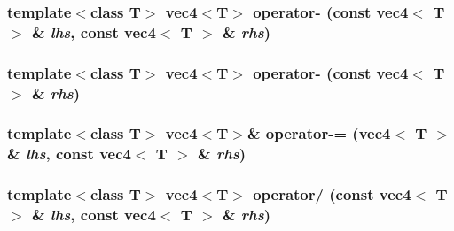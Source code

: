 \hypertarget{classnv_1_1vec4_212f0e52efde08a0093d329fcdaad1a3}{
\subsubsection[{operator-}]{\setlength{\rightskip}{0pt plus 5cm}template$<$class T$>$ {\bf vec4}$<$T$>$ operator- (const {\bf vec4}$<$ T $>$ \& {\em lhs}, \/  const {\bf vec4}$<$ T $>$ \& {\em rhs})}}
\label{classnv_1_1vec4_212f0e52efde08a0093d329fcdaad1a3}


\hypertarget{classnv_1_1vec4_8cc817f95174f06a8388b7fc2b8c2d3f}{
\subsubsection[{operator-}]{\setlength{\rightskip}{0pt plus 5cm}template$<$class T$>$ {\bf vec4}$<$T$>$ operator- (const {\bf vec4}$<$ T $>$ \& {\em rhs})}}
\label{classnv_1_1vec4_8cc817f95174f06a8388b7fc2b8c2d3f}


\hypertarget{classnv_1_1vec4_54e1e773b4df6a71b19eb4b5781a7ead}{
\subsubsection[{operator-=}]{\setlength{\rightskip}{0pt plus 5cm}template$<$class T$>$ {\bf vec4}$<$T$>$\& operator-= ({\bf vec4}$<$ T $>$ \& {\em lhs}, \/  const {\bf vec4}$<$ T $>$ \& {\em rhs})}}
\label{classnv_1_1vec4_54e1e773b4df6a71b19eb4b5781a7ead}


\hypertarget{classnv_1_1vec4_713208aac0e72cd0679403ee461d7b62}{
\subsubsection[{operator/}]{\setlength{\rightskip}{0pt plus 5cm}template$<$class T$>$ {\bf vec4}$<$T$>$ operator/ (const {\bf vec4}$<$ T $>$ \& {\em lhs}, \/  const {\bf vec4}$<$ T $>$ \& {\em rhs})}}
\label{classnv_1_1vec4_713208aac0e72cd0679403ee461d7b62}


